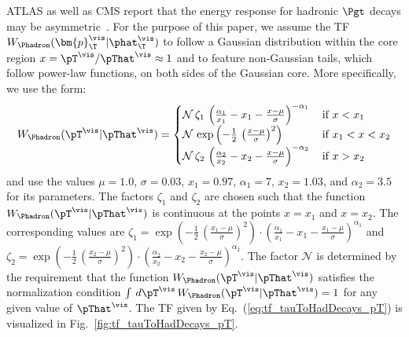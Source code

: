 ATLAS as well as CMS report that the energy response for hadronic
$\Pgt$ decays may be asymmetric~\cite{ATLAS:2011tfa,PRF-14-001}.
For the purpose of this paper, we assume the TF $W_{\Phadron}( \bm{p}_{\T}^{\vis} | \phat_{\T}^{\vis} )$ 
to follow a Gaussian distribution within the core region $x = \pT^{\vis}/\pThat^{\vis} \approx 1$ and to feature non-Gaussian tails,
which follow power-law functions, on both sides of the Gaussian core.
More specifically, we use the form:
\begin{equation}
W_{\Phadron}( \pT^{\vis} | \pThat^{\vis} ) = 
 \begin{cases}
   \mathcal{N} \, \zeta_{1} \, \left( \frac{\alpha_{1}}{x_{1}} - x_{1} - \frac{x - \mu}{\sigma} \right)^{-\alpha_{1}} \,  
 & \mbox{if } x < x_{1} \\
   \mathcal{N} \, \exp\left( -\frac{1}{2} \, \left( \frac{x - \mu}{\sigma} \right)^{2} \right) \,
 & \mbox{if } x_{1} < x < x_{2} \\
   \mathcal{N} \, \zeta_{2} \, \left( \frac{\alpha_{2}}{x_{2}} - x_{2} - \frac{x - \mu}{\sigma} \right)^{-\alpha_{2}} \,
 & \mbox{if } x > x_{2} 
 \end{cases}
\label{eq:tf_tauToHadDecays_pT}
\end{equation}
and use the values $\mu = 1.0$, $\sigma = 0.03$, $x_{1} = 0.97$, $\alpha_{1} = 7$,
$x_{2} = 1.03$, and $\alpha_{2} = 3.5$ for its parameters.
The factors $\zeta_{1}$ and $\zeta_{2}$ are chosen such that the
function $W_{\Phadron}( \pT^{\vis} | \pThat^{\vis} )$ is continuous at
the points $x = x_{1}$ and $x = x_{2}$. 
The corresponding values are 
$\zeta_{1} = \exp\left( -\frac{1}{2} \, \left( \frac{x_{1} - \mu}{\sigma} \right)^{2} \right) \cdot \left( \frac{\alpha_{1}}{x_{1}} - x_{1} - \frac{x_{1} - \mu}{\sigma} \right)^{\alpha_{1}}$
and
$\zeta_{2} = \exp\left( -\frac{1}{2} \, \left( \frac{x_{2} - \mu}{\sigma} \right)^{2} \right) \cdot \left( \frac{\alpha_{2}}{x_{2}} - x_{2} - \frac{x_{2} - \mu}{\sigma} \right)^{\alpha_{2}}$.
The factor $\mathcal{N}$ is determined by the requirement that the function $W_{\Phadron}( \pT^{\vis} | \pThat^{\vis} )$ 
satisfies the normalization condition $\int \, d\pT^{\vis} \, W_{\Phadron}( \pT^{\vis} | \pThat^{\vis} ) = 1$ for any given value of $\pThat^{\vis}$.
The TF given by Eq.~(\ref{eq:tf_tauToHadDecays_pT}) is visualized in Fig.~\ref{fig:tf_tauToHadDecays_pT}.

